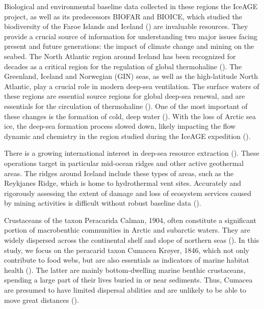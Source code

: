 Biological and environmental baseline data collected in these regions the IceAGE project, as well as its predecessors BIOFAR and BIOICE, which studied the biodiversity of the Faroe Islands and Iceland (\citep{meisner_prefacebiodiversity_2018}) are invaluable resources. They provide a crucial source of information for understanding two major issues facing present and future generations: the impact of climate change and mining on the seabed. The North Atlantic region around Iceland has been recognized for decades as a critical region for the regulation of global thermohaline (\citep{meisner_prefacebiodiversity_2018}). The Greenland, Iceland and Norwegian (GIN) seas, as well as the high-latitude North Atlantic, play a crucial role in modern deep-sea ventilation. The surface waters of these regions are essential source regions for global deep-sea renewal, and are essentials for the circulation of thermohaline (\citep{johannessen_relationship_1994}). One of the most important of these changes is the formation of cold, deep water (\citep{meisner_prefacebiodiversity_2018}). With the loss of Arctic sea ice, the deep-sea formation process slowed down, likely impacting the flow dynamic and chemistry in the region studied during the IceAGE expedition (\citep{meisner_prefacebiodiversity_2018}).

There is a growing international interest in deep-sea resource extraction (\citep{mengerink_call_2014}). These operations target in particular mid-ocean ridges and other active geothermal areas. The ridges around Iceland include these types of areas, such as the Reykjanes Ridge, which is home to hydrothermal vent sites. Accurately and rigorously assessing the extent of damage and loss of ecosystem services caused by mining activities is difficult without robust baseline data (\citep{meisner_prefacebiodiversity_2018}).

Crustaceans of the taxon Peracarida Calman, 1904, often constitute a significant portion of macrobenthic communities in Arctic and subarctic waters. They are widely dispersed across the continental shelf and slope of northern seas (\citep{stransky_diversity_2010}). In this study, we focus on the peracarid taxon Cumacea Krøyer, 1846, which not only contribute to food webs, but are also essentials as indicators of marine habitat health (\citep{stransky_diversity_2010}). The latter are mainly bottom-dwelling marine benthic crustaceans, spending a large part of their lives buried in or near sediments. Thus, Cumacea are presumed to have limited dispersal abilities and are unlikely to be able to move great distances (\citep{uhlir_adding_2021}).

